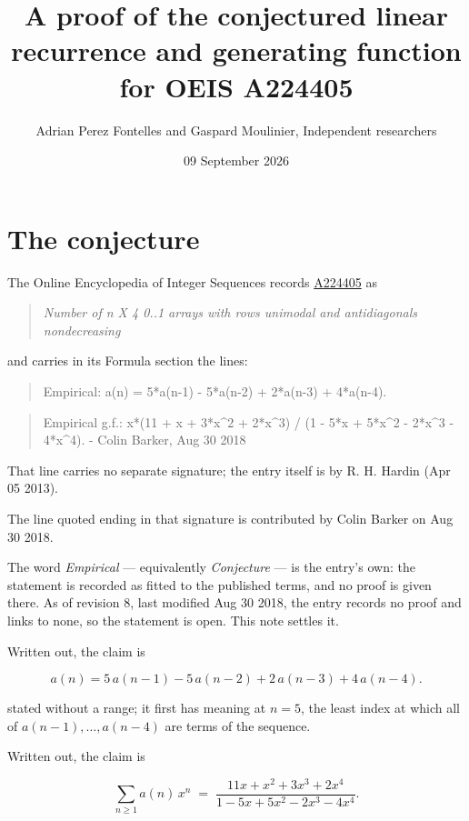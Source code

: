 \documentclass[11pt]{article}
\title{A proof of the conjectured linear recurrence and generating function for OEIS A224405}
\author{Adrian Perez Fontelles and Gaspard Moulinier, Independent researchers}
\date{09 September 2026}
\theoremstyle{definition}
\begin{document}
\maketitle
\section{The conjecture}

The Online Encyclopedia of Integer Sequences records \href{https://oeis.org/A224405}{A224405} as

\begin{quote}\itshape Number of n X 4 0..1 arrays with rows unimodal and antidiagonals nondecreasing\end{quote}

and carries in its Formula section the lines:

\begin{quote}\ttfamily Empirical: a(n) = 5*a(n-1) - 5*a(n-2) + 2*a(n-3) + 4*a(n-4).\end{quote}

\begin{quote}\ttfamily Empirical g.f.: x*(11 + x + 3*x\textasciicircum{}2 + 2*x\textasciicircum{}3) / (1 - 5*x + 5*x\textasciicircum{}2 - 2*x\textasciicircum{}3 - 4*x\textasciicircum{}4). - Colin Barker, Aug 30 2018\end{quote}

That line carries no separate signature; the entry itself is by R. H. Hardin (Apr 05 2013).

The line quoted ending in that signature is contributed by Colin Barker on Aug 30 2018.

The word {\itshape Empirical} --- equivalently {\itshape Conjecture} --- is the entry's own: the statement is recorded as fitted to the published terms, and no proof is given there. As of revision 8, last modified Aug 30 2018, the entry records no proof and links to none, so the statement is open. This note settles it.

Written out, the claim is

\[a(n) = 5\,a(n-1) - 5\,a(n-2) + 2\,a(n-3) + 4\,a(n-4).\]

stated without a range; it first has meaning at $n = 5$, the least index at which all of $a(n-1),\dots,a(n-4)$ are terms of the sequence.

Written out, the claim is

\[\sum_{n \ge 1} a(n)\,x^n \;=\; \frac{11x + x^{2} + 3x^{3} + 2x^{4}}{1 - 5x + 5x^{2} - 2x^{3} - 4x^{4}}.\]
\end{document}
